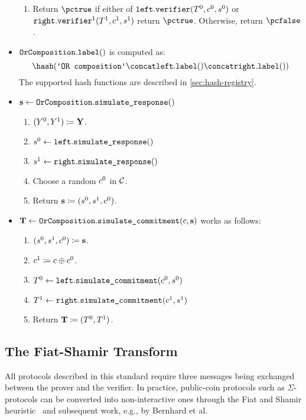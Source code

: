 \documentclass[11pt]{article}
\begin{document}
\begin{itemize}
\begin{enumerate}
      \item
	    Return $\pctrue$ if either of $\texttt{left}.\texttt{verifier}(T^0,c^0,s^0)$ or $\texttt{right}.\texttt{verifier}^1(T^1,c^1,s^1)$ return $\pctrue$. Otherwise, return $\pcfalse$.
    \end{enumerate}
  \item  $\texttt{OrComposition}.\texttt{label}()$ is computed as:
    \[
     \hash(\orlabel \concat \leftbranch.\labeltt() \concat \rightbranch.\labeltt())
   \]
   The supported hash functions are described in \cref{sec:hash-registry}.
  \item
  $\mathbf {s} \gets \texttt{OrComposition}.\texttt{simulate\_response}()$
    \begin{enumerate}
      \item
         $(Y^0,Y^1)\coloneqq \mathbf {Y}$.
      \item
         $s^0\gets\texttt{left}.\texttt{simulate\_response}()$
      \item $s^1\gets\texttt{right}.\texttt{simulate\_response}()$
      \item
        Choose a random $c^0$ in $\mathcal{C}$.
			\item
        Return $\mathbf {s} \coloneqq (s^0,s^1,c^0)$.
    \end{enumerate}
\item
$\mathbf {T} \gets \texttt{OrComposition}.\texttt{simulate\_commitment}(c, \mathbf {s})$ works as follows:
\begin{enumerate}
      \item
        $(s^0,s^1,c^0)\coloneqq\mathbf{s}$.
      \item
        $c^1\coloneqq c \oplus c^0$.
      \item
        $T^0 \gets\texttt{left}.\texttt{simulate\_commitment}(c^0,s^0)$
    \item $T^1\gets\texttt{right}.\texttt{simulate\_commitment}(c^1,s^1)$
      \item
        Return $\mathbf {T} \coloneqq (T^0,T^1)$.
    \end{enumerate}
\end{itemize}


\subsection{The Fiat-Shamir Transform}\label{sec:fs}
All protocols described in this standard require three messages being exchanged between the prover and the verifier.
In practice, public-coin protocols such as $\Sigma$-protocols can be converted into non-interactive ones through the
Fiat and Shamir heuristic~\cite{C:FiaSha86} and subsequent work, e.g., by Bernhard et al.~\cite{AC:BerPerWar12}
\end{document}
